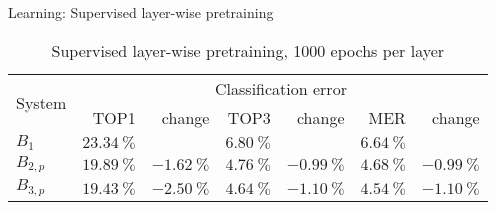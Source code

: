 \begin{frame}{Learning: Supervised layer-wise pretraining}
\begin{table}[tb]
    \centering
    \begin{tabular}{lrrrrrr}
    \toprule
    \multirow{2}{*}{System}& \multicolumn{6}{c}{Classification error}\\
    \cmidrule(l){2-7}
              & TOP1                   & change                 & TOP3                  & change                 & MER                & change \\\midrule
    $B_1$     & $\SI{23.34}{\percent}$ &                        & $\SI{6.80}{\percent}$ &                        & $\SI{6.64}{\percent}$ & \\%
    $B_{2,p}$ & $\SI{19.89}{\percent}$ & $\SI{-1.62}{\percent}$ & $\SI{4.76}{\percent}$ & $\SI{-0.99}{\percent}$ & $\SI{4.68}{\percent}$ & $\SI{-0.99}{\percent}$\\
    $B_{3,p}$ & \underline{$\SI{19.43}{\percent}$} & $\SI{-2.50}{\percent}$ & \underline{$\SI{4.64}{\percent}$} & $\SI{-1.10}{\percent}$ & \underline{$\SI{4.54}{\percent}$} & $\SI{-1.10}{\percent}$\\
    \bottomrule
    \end{tabular}
    \caption{Supervised layer-wise pretraining, 1000 epochs per layer}
\label{table:pretraining-copy-before}
\end{table}
\end{frame}


